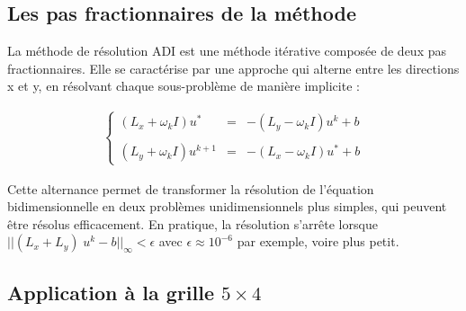 \documentclass{article}
\begin{document}
 \subsection{Les pas fractionnaires de la méthode}
    
La méthode de résolution ADI est une méthode itérative composée de deux pas fractionnaires.
Elle se caractérise par une approche qui alterne entre les directions x et y, en résolvant chaque sous-problème de manière implicite :

 \begin{eqnarray}\left\{ 
\begin{array}{lcl}
  (L_x+\omega_k I) u^* &=& -(L_y-\omega_k I) u^k +b \\
  \\
 (L_y+\omega_k I) u^{k+1} &=& -(L_x-\omega_k I) u^* +b \end{array} \right. 
  \label{ADI}
  \end{eqnarray}
  
Cette alternance permet de transformer la résolution de l'équation bidimensionnelle en deux problèmes unidimensionnels plus simples, qui peuvent être résolus efficacement.
En pratique, la résolution s'arrête lorsque  $||(L_x+L_y) \; u^k -b||_\infty < \epsilon$ avec $\epsilon \approx 10^{-6}$
par exemple, voire plus petit.

 \subsection{Application à la grille $5 \times 4$}
 
\end{document}
